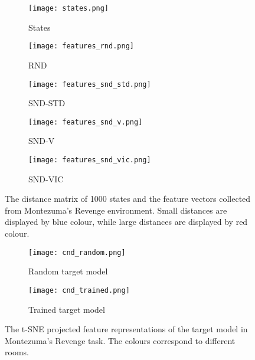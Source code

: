 \documentclass[a4paper,11pt]{elsarticle}
\begin{document}
\begin{figure}[t!]
  \centering
  \begin{subfigure}[b]{0.49\textwidth}
    \centering
    \texttt{[image: states.png]}
    \caption{States}
    \label{fig:analysis2a}
  \end{subfigure}
  \begin{subfigure}[b]{0.49\textwidth}
    \centering
    \texttt{[image: features\_rnd.png]}
    \caption{RND}
    \label{fig:analysis2b}
  \end{subfigure}  
  \begin{subfigure}[b]{0.3\textwidth}
    \centering
    \texttt{[image: features\_snd\_std.png]}
    \caption{SND-STD}
    \label{fig:analysis2d}
  \end{subfigure}
  \begin{subfigure}[b]{0.3\textwidth}
    \centering
    \texttt{[image: features\_snd\_v.png]}
    \caption{SND-V}
    \label{fig:analysis2c}
  \end{subfigure}
  \begin{subfigure}[b]{0.3\textwidth}
    \centering
    \texttt{[image: features\_snd\_vic.png]}
    \caption{SND-VIC}
    \label{fig:analysis2e}   
  \end{subfigure}
\caption{The distance matrix of 1000 states and the feature vectors collected from Montezuma's Revenge environment. Small distances are displayed by blue colour, while large distances are displayed by red colour.}
\label{fig:snd_state_features}
\end{figure}

\begin{figure}[thb]
  \begin{subfigure}{0.5\textwidth}
    \centering
    \texttt{[image: cnd\_random.png]}
    \caption{Random target model}
    \label{fig:target_features_random}
  \end{subfigure}
  \begin{subfigure}{0.5\textwidth}
    \centering
    \texttt{[image: cnd\_trained.png]}
    \caption{Trained target model}
    \label{fig:trained_features_random}
  \end{subfigure}  
\caption{The t-SNE projected feature representations of the target model in Montezuma's Revenge task. The colours correspond to different rooms.}
\label{fig:cnd_feature_space}
\end{figure}
\end{document}
